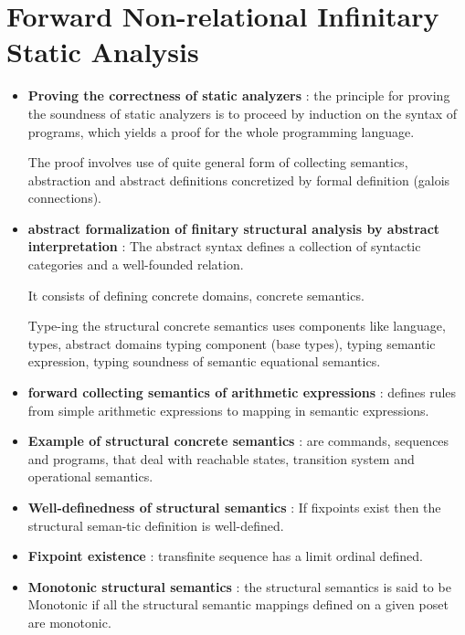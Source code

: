 \chapter{Forward Non-relational Infinitary Static Analysis}

\begin{itemize}
	\item{\textbf{Proving the correctness of static analyzers} : the principle for proving the soundness of static analyzers is to proceed by induction on the syntax of programs, which yields a proof for the whole programming language.

	The proof involves use of quite general form of collecting semantics, abstraction and abstract definitions concretized by formal definition (galois connections).
	}
	

	\item{\textbf{abstract formalization of finitary structural analysis by abstract interpretation} : The abstract syntax defines a collection of syntactic categories and a well-founded relation.
	
	It consists of defining concrete domains, concrete semantics.

	Type-ing the structural concrete semantics uses components like language, types, abstract domains typing component (base types), typing semantic expression, typing soundness of semantic equational semantics.
	}

	\item{\textbf{forward collecting semantics of arithmetic expressions} : defines rules from simple arithmetic expressions to mapping in semantic expressions. 
	}

	\item{\textbf{Example of structural concrete semantics} : are commands,	sequences and programs, that deal with reachable states, transition system and operational semantics.
	}

	\item{\textbf{Well-definedness of structural semantics} : If fixpoints exist then the structural seman-tic definition is well-defined.
	}

	\item{\textbf{Fixpoint existence} : transfinite sequence has a limit ordinal defined.
	}

	\item{\textbf{Monotonic structural semantics} : the structural semantics is said to be Monotonic if all the structural semantic mappings defined on a given poset are monotonic.

}
\end{itemize}
